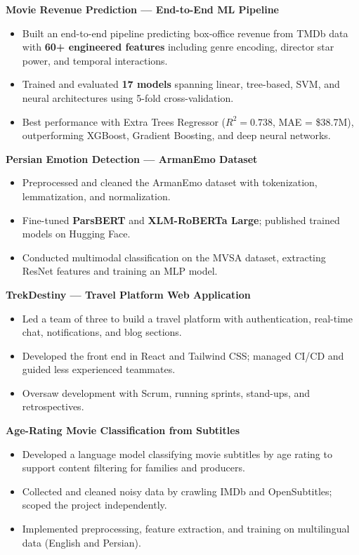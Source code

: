 \documentclass[letterpaper,10pt]{article}
\newcommand{\entry}[2]{%
  \noindent\textbf{#1}\hfill{\small\color{mygray}#2}%
}
\begin{document}
\vspace{3pt}
\entry{Movie Revenue Prediction --- End-to-End ML Pipeline}{}
\begin{itemize}
  \item Built an end-to-end pipeline predicting box-office revenue from TMDb data with \textbf{60+ engineered features} including genre encoding, director star power, and temporal interactions.
  \item Trained and evaluated \textbf{17 models} spanning linear, tree-based, SVM, and neural architectures using 5-fold cross-validation.
  \item Best performance with Extra Trees Regressor ($R^2 = 0.738$, MAE = \$38.7M), outperforming XGBoost, Gradient Boosting, and deep neural networks.
\end{itemize}

\vspace{3pt}
\entry{Persian Emotion Detection --- ArmanEmo Dataset}{}
\begin{itemize}
  \item Preprocessed and cleaned the ArmanEmo dataset with tokenization, lemmatization, and normalization.
  \item Fine-tuned \textbf{ParsBERT} and \textbf{XLM-RoBERTa Large}; published trained models on Hugging Face.
  \item Conducted multimodal classification on the MVSA dataset, extracting ResNet features and training an MLP model.
\end{itemize}

\vspace{3pt}
\entry{TrekDestiny --- Travel Platform Web Application}{}
\begin{itemize}
  \item Led a team of three to build a travel platform with authentication, real-time chat, notifications, and blog sections.
  \item Developed the front end in React and Tailwind CSS; managed CI/CD and guided less experienced teammates.
  \item Oversaw development with Scrum, running sprints, stand-ups, and retrospectives.
\end{itemize}

\vspace{3pt}
\entry{Age-Rating Movie Classification from Subtitles}{}
\begin{itemize}
  \item Developed a language model classifying movie subtitles by age rating to support content filtering for families and producers.
  \item Collected and cleaned noisy data by crawling IMDb and OpenSubtitles; scoped the project independently.
  \item Implemented preprocessing, feature extraction, and training on multilingual data (English and Persian).
\end{itemize}
\end{document}

